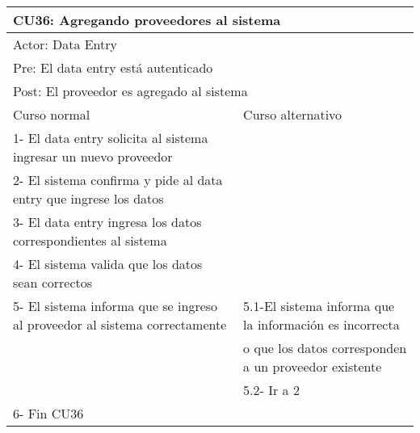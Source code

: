\begin{table}[H]
  \begin{adjustbox}{max width = \textwidth}
  \begin{tabular}{|l|l|}
    \hline
    \multicolumn{2}{|l|}{CU36: Agregando proveedores al sistema} \\\hline
    \multicolumn{2}{|l|}{Actor: Data Entry} \\\hline
    \multicolumn{2}{|l|}{Pre: El data entry está autenticado} \\\hline
    \multicolumn{2}{|l|}{Post: El proveedor es agregado al sistema} \\\hline
     Curso normal & Curso alternativo\\ \hline
	 1- El data entry solicita al sistema ingresar un nuevo proveedor & \\ \hline
     2- El sistema confirma y pide al data entry que ingrese los datos & \\ \hline
     3- El data entry ingresa los datos correspondientes al sistema & \\ \hline
     4- El sistema valida que los datos sean correctos & \\ \hline
     5- El sistema informa que se ingreso al proveedor al sistema correctamente & 5.1-El sistema informa que la información es incorrecta \\ & o que los datos corresponden a un proveedor existente  \\ & 5.2- Ir a 2 \\ \hline
     6- Fin CU36 & \\ \hline
  \end{tabular}
  \end{adjustbox}
\end{table}



